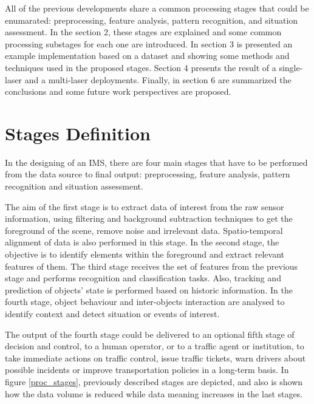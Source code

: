 \documentclass[10pt,twocolumn,letterpaper]{article}
\begin{document}
All of the previous developments share a common processing stages that could be enumarated: preprocessing, feature analysis, pattern recognition, and situation assessment. In the section 2, these stages are explained and some common processing substages for each one are introduced. In section 3 is presented an example implementation based on a dataset and showing some methods and techniques used in the proposed stages. Section 4 presents the result of a single-laser and a multi-laser deployments. Finally, in section 6 are summarized the conclusions and some future work perspectives are proposed.



\section{Stages Definition}
In the designing of an IMS, there are four main stages that have to be performed from the data source to final output: preprocessing, feature analysis, pattern recognition and situation assessment.

The aim of the first stage is to extract data of interest from the raw sensor information, using filtering and background subtraction techniques to get the foreground of the scene, remove noise and irrelevant data. Spatio-temporal alignment of data is also performed in this stage. In the second stage, the objective is to identify elements within the foreground and extract relevant features of them. The third stage receives the set of features from the previous stage and performs recognition and classification tasks. Also, tracking and prediction of objects' state is performed based on historic information. In the fourth stage, object behaviour and inter-objects interaction are analysed to identify context and detect situation or events of interest.

The output of the fourth stage could be delivered to an optional fifth stage of decision and control, to a human operator, or to a traffic agent or institution, to take immediate actions on traffic control, issue traffic tickets, warn drivers about possible incidents or improve transportation policies in a long-term basis. In figure \ref{proc_stages}, previously described stages are depicted, and also is shown how the data volume is reduced while data meaning increases in the last stages.
\end{document}
